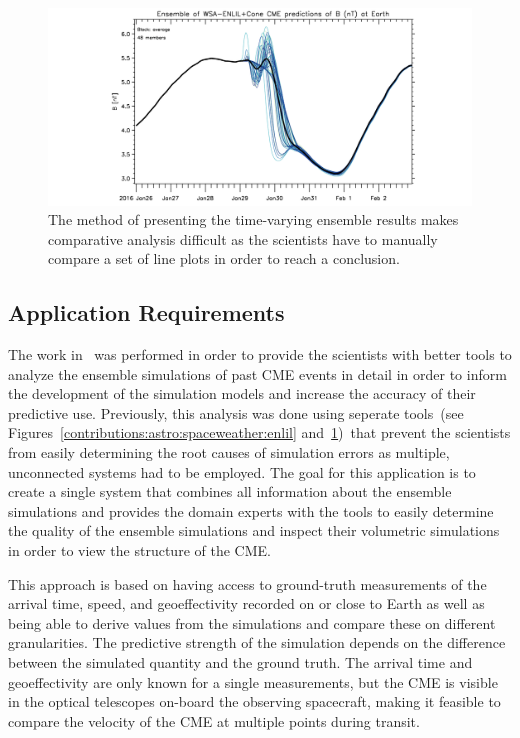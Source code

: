 \begin{figure}
\includegraphics[width=\textwidth]{figures/contributions/spaceweather/ensemble.png}
\caption{The method of presenting the time-varying ensemble results makes comparative analysis difficult as the scientists have to manually compare a set of line plots in order to reach a conclusion.}
\label{contributions:astro:spaceweather:ensemble}
\end{figure}


\subsection{Application Requirements} \label{contributions:astro:spaceweather:requirements}
The work in \paperCME\ was performed in order to provide the scientists with better tools to analyze the ensemble simulations of past CME events in detail in order to inform the development of the simulation models and increase the accuracy of their predictive use.  Previously, this analysis was done using seperate tools~(see Figures~\ref{contributions:astro:spaceweather:enlil} and~\ref{contributions:astro:spaceweather:ensemble})~that prevent the scientists from easily determining the root causes of simulation errors as multiple, unconnected systems had to be employed.  The goal for this application is to create a single system that combines all information about the ensemble simulations and provides the domain experts with the tools to easily determine the quality of the ensemble simulations and inspect their volumetric simulations in order to view the  structure of the CME.

This approach is based on having access to ground-truth measurements of the arrival time, speed, and geoeffectivity recorded on or close to Earth as well as being able to derive values from the simulations and compare these on different granularities.  The predictive strength of the simulation depends on the difference between the simulated quantity and the ground truth.  The arrival time and geoeffectivity are only known for a single measurements, but the CME is visible in the optical telescopes on-board the observing spacecraft, making it feasible to compare the velocity of the CME at multiple points during transit.

